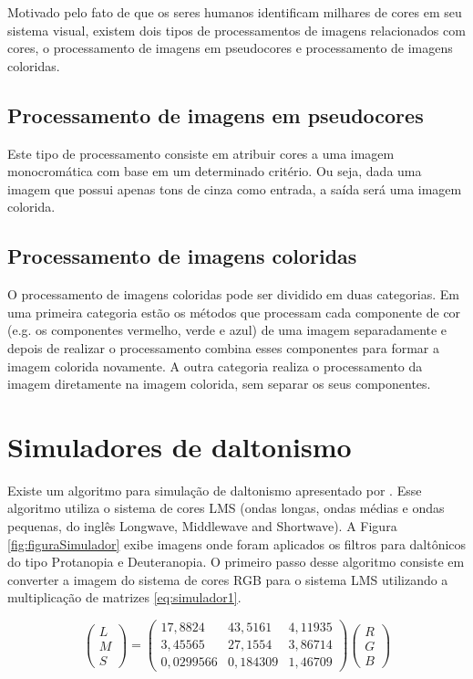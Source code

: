 \documentclass[	12pt, Times, openright, twoside, a4paper, english, brazil]{abntex2}
\begin{document}
Motivado pelo fato de que os seres humanos identificam milhares de cores em seu sistema visual, existem dois tipos de processamentos de imagens relacionados com cores, o processamento de imagens em pseudocores e processamento de imagens coloridas.

\subsection{Processamento de imagens em pseudocores}
Este tipo de processamento consiste em atribuir cores a uma imagem monocromática com base em um determinado critério. Ou seja, dada uma imagem que possui apenas tons de cinza como entrada, a saída será uma imagem colorida.

\subsection{Processamento de imagens coloridas}

O processamento de imagens coloridas pode ser dividido em duas categorias. Em uma primeira categoria estão os métodos que processam cada componente de cor (e.g. os componentes vermelho, verde e azul) de uma imagem separadamente e depois de realizar o processamento combina esses componentes para formar a imagem colorida novamente. A outra categoria realiza o processamento da imagem diretamente na imagem colorida, sem separar os seus componentes.

\section{Simuladores de daltonismo}
\label{sec:simulacao}

Existe um algoritmo para simulação de daltonismo apresentado por . Esse algoritmo utiliza o sistema de cores LMS (ondas longas, ondas médias e ondas pequenas, do inglês Longwave, Middlewave and Shortwave). A Figura \ref{fig:figuraSimulador} exibe imagens onde foram aplicados os filtros para daltônicos do tipo Protanopia e Deuteranopia. O primeiro passo desse algoritmo consiste em converter a imagem do sistema de cores RGB para o sistema LMS utilizando a multiplicação de matrizes \ref{eq:simulador1}.

\begin{equation}
\left(\begin{array}{ccc}
L\\M\\S
\end{array}\right)
=
\left(\begin{array}{ccc}
17,8824 & 43,5161 & 4,11935 \\
3,45565 & 27,1554 & 3,86714 \\
0,0299566 & 0,184309 & 1,46709
\end{array}\right)
\left(\begin{array}{ccc}
R\\G\\B
\end{array}\right)
\label{eq:simulador1}
\end{equation}
\end{document}
